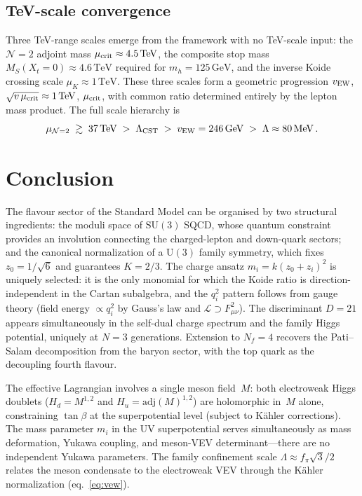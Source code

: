 \documentclass[12pt,a4paper]{article}
\newcommand{\SU}{\mathrm{SU}}
\newcommand{\UU}{\mathrm{U}}
\newcommand{\Nf}{N_f}
\newcommand{\adj}{\mathrm{adj}}
\newcommand{\MeV}{\,\mathrm{MeV}}
\newcommand{\GeV}{\,\mathrm{GeV}}
\newcommand{\TeV}{\,\mathrm{TeV}}
\begin{document}
\subsection{TeV-scale convergence}

Three TeV-range scales emerge from the framework
with no TeV-scale input:
the $\mathcal{N}=2$ adjoint mass
$\mu_{\rm crit} \approx 4.5\TeV$, the composite stop mass
$M_S(X_t{=}0) \approx 4.6\TeV$ required for $m_h = 125\GeV$,
and the inverse Koide crossing scale $\mu_K \approx 1\TeV$.
These three scales form a geometric progression
$v_{\rm EW}$, $\sqrt{v\,\mu_{\rm crit}} \approx 1\TeV$,
$\mu_{\rm crit}$, with common ratio determined entirely by the
lepton mass product. The full scale hierarchy is
\begin{equation}
  \mu_{\mathcal{N}=2} \;\gtrsim\; 37\TeV
  \;>\; \Lambda_{\rm CST}
  \;>\; v_{\rm EW} = 246\GeV
  \;>\; \Lambda \approx 80\MeV\,.
  \label{eq:scales}
\end{equation}


\section{Conclusion}
\label{sec:conclusion}

The flavour sector of the Standard Model can be organised by two
structural ingredients: the moduli space of $\SU(3)$ SQCD, whose
quantum constraint provides an involution connecting the charged-lepton
and down-quark sectors; and the canonical normalization of a $\UU(3)$
family symmetry, which fixes $z_0 = 1/\sqrt{6}$ and guarantees
$K = 2/3$.  The charge ansatz $m_i = k(z_0{+}z_i)^2$ is uniquely
selected: it is the only monomial for which the Koide ratio is
direction-independent in the Cartan subalgebra, and the $q_i^2$
pattern follows from gauge theory (field energy $\propto q_i^2$
by Gauss's law and $\mathcal{L}\supset F_{\mu\nu}^2$).
The discriminant $D = 21$ appears simultaneously in the
self-dual charge spectrum and the family Higgs potential, uniquely at
$N = 3$ generations. Extension to $\Nf = 4$ recovers the Pati--Salam
decomposition from the baryon sector, with the top quark as the
decoupling fourth flavour.

The effective Lagrangian involves a single meson field~$M$: both
electroweak Higgs doublets ($H_d = M^{1,2}$ and $H_u = \adj(M)^{1,2}$)
are holomorphic in~$M$ alone, constraining $\tan\beta$ at the
superpotential level (subject to K\"ahler corrections).
The mass parameter $m_i$ in the UV superpotential serves
simultaneously as mass deformation, Yukawa coupling, and meson-VEV
determinant---there are no independent Yukawa parameters. The family
confinement scale $\Lambda \approx f_\pi\sqrt{3}/2$ relates the
meson condensate to the electroweak VEV through the K\"ahler
normalization (eq.~\ref{eq:vew}).
\end{document}
